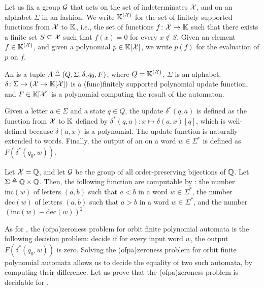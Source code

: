 \AP Let us fix a group $\mathcal{G}$ that acts on the set of indeterminates
$\mathcal{X}$, and on an alphabet $\Sigma$ in an 
fashion. We write $\mathbb{K}^{(\mathcal{X})}$ for the set of finitely supported functions
from $\mathcal{X}$ to $\mathbb{K}$, i.e., the set of functions $f \colon \mathcal{X} \to \mathbb{K}$
such that there exists a finite set $S \subseteq \mathcal{X}$ such that $f(x) = 0$
for every $x \notin S$. Given an element $f \in \mathbb{K}^{(\mathcal{X})}$, and given a
polynomial $p \in \mathbb{K}[\mathcal{X}]$, we write $p(f)$ for the evaluation of
$p$ on $f$.


\begin{definition}
  \label{def:orbit-finite-polynomial-automaton}
  An  is a tuple $A \triangleq (Q, \Sigma, \delta, q_0, F)$, where $Q =
  \mathbb{K}^{(\mathcal{X})}$, $\Sigma$ is an  alphabet, $\delta \colon
  \Sigma \to (\mathcal{X} \to \mathbb{K}[\mathcal{X}])$ is a \kl(func){finitely supported}
  polynomial update function, and $F \in \mathbb{K}[\mathcal{X}]$ is a polynomial
  computing the result of the automaton. 

  Given a letter $a \in \Sigma$ and a
  state $q \in Q$, the update $\delta^*(q,a)$ is defined as the function from
  $\mathcal{X}$ to $\mathbb{K}$ defined by $\delta^*(q,a) \colon x \mapsto \delta(a,x)[ q ]$,
  which is well-defined because $\delta(a,x)$ is a 
  polynomial. The update function is naturally extended to words. Finally, the
  output of an  on a word $w \in \Sigma^*$
  is defined as $F(\delta^*(q_0, w))$.
\end{definition}


\begin{example}
  \label{ex:orbit-finite-polynomial-automata}
  Let $\mathcal{X} = \mathbb{Q}$, and let $\mathcal{G}$ be the group of all
  order-preserving bijections of $\mathbb{Q}$.
  Let $\Sigma \triangleq \mathbb{Q} \times \mathbb{Q}$.
  Then, the following function are computable by 
  :
  the number $\mathrm{inc}(w)$ of letters $(a,b)$ such that $a < b$ in a word $w \in \Sigma^*$,
  the number $\mathrm{dec}(w)$ of letters $(a,b)$ such that $a > b$ in a word $w \in \Sigma^*$,
  and the number $(\mathrm{inc}(w) - \mathrm{dec}(w))^2$.
\end{example}

\AP As for , the \intro(ofpa){zeroness problem} for
orbit finite polynomial automata is the following decision problem: decide if
for every input word $w$, the output $F(\delta^*(q_0, w))$ is zero. Solving the
\kl(ofpa){zeroness problem} for orbit finite polynomial automata allows us to
decide the equality of two such automata, by computing their difference. Let us
prove that the \kl(ofpa){zeroness problem} is decidable for .

